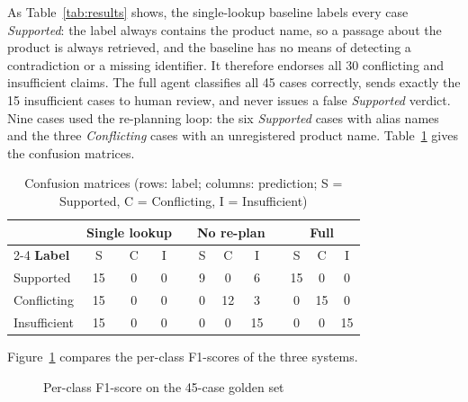 As Table~\ref{tab:results} shows, the single-lookup baseline labels every case \emph{Supported}: the
label always contains the product name, so a passage about the product is always retrieved, and the
baseline has no means of detecting a contradiction or a missing identifier. It therefore endorses all
30 conflicting and insufficient claims. The full agent classifies all 45 cases correctly, sends exactly
the 15 insufficient cases to human review, and never issues a false \emph{Supported} verdict. Nine cases
used the re-planning loop: the six \emph{Supported} cases with alias names and the three
\emph{Conflicting} cases with an unregistered product name. Table~\ref{tab:confusion} gives the
confusion matrices.

\begin{table}[H]
\centering
\caption{Confusion matrices (rows: label; columns: prediction; S = Supported, C = Conflicting, I = Insufficient)}
\label{tab:confusion}
\small
\begin{tabular}{@{}l ccc c ccc c ccc@{}}
\toprule
& \multicolumn{3}{c}{\textbf{Single lookup}} && \multicolumn{3}{c}{\textbf{No re-plan}} && \multicolumn{3}{c}{\textbf{Full}} \\
\cmidrule{2-4}\cmidrule{6-8}\cmidrule{10-12}
\textbf{Label} & S & C & I && S & C & I && S & C & I \\ \midrule
Supported & 15 & 0 & 0 && 9 & 0 & 6 && 15 & 0 & 0 \\
Conflicting & 15 & 0 & 0 && 0 & 12 & 3 && 0 & 15 & 0 \\
Insufficient & 15 & 0 & 0 && 0 & 0 & 15 && 0 & 0 & 15 \\
\bottomrule
\end{tabular}
\end{table}

Figure~\ref{fig:f1} compares the per-class F1-scores of the three systems.

\begin{figure}[H]
\centering
{}
\caption{Per-class F1-score on the 45-case golden set}
\label{fig:f1}
\end{figure}

